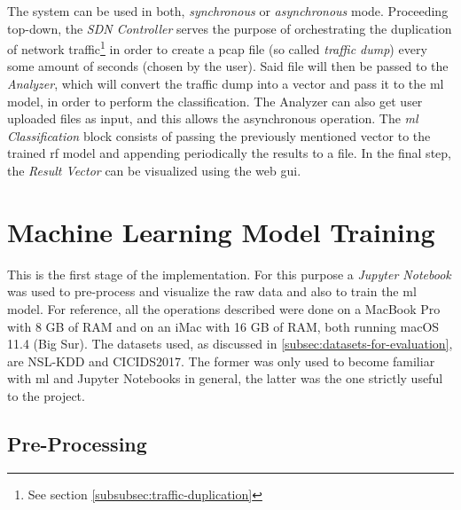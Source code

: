 \noindent The system can be used in both, \textit{synchronous} or \textit{asynchronous} mode. Proceeding top-down, the \textit{SDN Controller} serves the purpose of orchestrating the duplication of network traffic\footnote{See section \ref{subsubsec:traffic-duplication}} in order to create a \gls{pcap} file (so called \textit{traffic dump}) every some amount of seconds (chosen by the user). Said file will then be passed to the \textit{Analyzer}, which will convert the traffic dump into a vector and pass it to the \gls{ml} model, in order to perform the classification. The Analyzer can also get user uploaded files as input, and this allows the asynchronous operation. The \textit{\gls{ml} Classification} block consists of passing the previously mentioned vector to the trained \gls{rf} model and appending periodically the results to a  file. In the final step, the \textit{Result Vector} can be visualized using the web \gls{gui}.


\section{Machine Learning Model Training}
\label{sec:model-training}

This is the first stage of the implementation. For this purpose a \textit{Jupyter Notebook} was used to pre-process and visualize the raw data and also to train the \gls{ml} model. For reference, all the operations described were done on a MacBook Pro with 8 GB of RAM and on an iMac with 16 GB of RAM, both running macOS 11.4 (Big Sur). The datasets used, as discussed in \ref{subsec:datasets-for-evaluation}, are NSL-KDD and CICIDS2017. The former was only used to become familiar with \gls{ml} and Jupyter Notebooks in general, the latter was the one strictly useful to the project.


\subsection{Pre-Processing}
\label{subsec:pre-processing}

